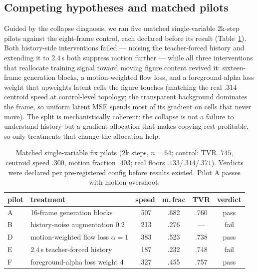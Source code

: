 \documentclass[10pt,twocolumn]{article}
\begin{document}
\subsection{Competing hypotheses and matched pilots}
Guided by the collapse diagnosis, we ran five matched single-variable 2k-step pilots
against the eight-frame control, each declared before its result (Table~\ref{tab:pilots}). Both history-side
interventions failed — noising the teacher-forced history and extending it to $2.4$\,s both suppress motion further —
while all three interventions that reallocate training signal toward moving figure content revived it:
sixteen-frame generation blocks, a motion-weighted flow loss, and a foreground-alpha loss weight
that upweights latent cells the figure touches (matching the real $.314$ centroid speed at control-level topology; the
transparent background dominates the frame, so uniform latent MSE spends most of its gradient on cells that never
move). The split is mechanistically coherent: the collapse is not a failure to understand history but a gradient
allocation that makes copying rest profitable, so only treatments that change the allocation help.

\begin{table}[t]\centering\caption{Matched single-variable fix pilots (2k steps, $n{=}64$; control: TVR $.745$,
centroid speed $.300$, motion fraction $.403$; real floors $.133$/$.314$/$.371$). Verdicts were declared per
pre-registered config before results existed. Pilot A passes with motion overshoot.}\label{tab:pilots}\scriptsize
\setlength{\tabcolsep}{3pt}
\begin{tabular}{@{}lp{}cccc@{}}
\toprule
pilot & treatment & speed & m.\,frac & TVR & verdict \\
\midrule
A & 16-frame generation blocks & .507 & .682 & .760 & pass \\
B & history-noise augmentation $0.2$ & .213 & .276 & — & fail \\
D & motion-weighted flow loss $\alpha{=}1$ & .383 & .523 & .738 & pass \\
E & $2.4$\,s teacher-forced history & .187 & .232 & .748 & fail \\
F & foreground-alpha loss weight $4$ & .327 & .455 & .757 & pass \\
\bottomrule
\end{tabular}
\end{table}
\end{document}
